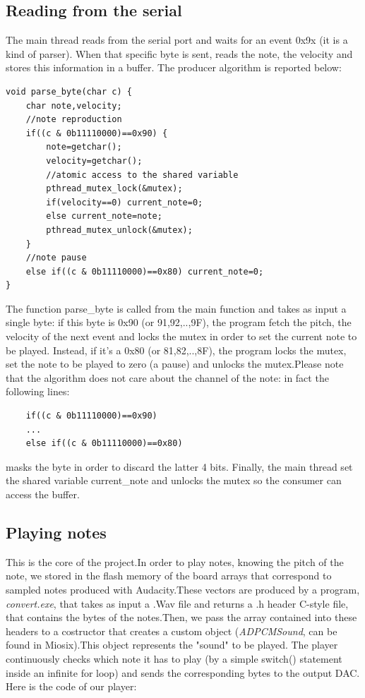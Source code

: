 \documentclass[12pt]{article}
\begin{document}
\subsection{Reading from the serial}\label{subsec:reading}
The main thread reads from the serial port and waits for an event 0x9x (it is a kind of parser). When that specific byte is sent, reads the note, the velocity and stores this information in a buffer. The producer algorithm is reported below:
\begin{lstlisting}
void parse_byte(char c) {
	char note,velocity;
	//note reproduction
	if((c & 0b11110000)==0x90) {
		note=getchar();
		velocity=getchar();
		//atomic access to the shared variable
		pthread_mutex_lock(&mutex);
		if(velocity==0) current_note=0;
		else current_note=note;
		pthread_mutex_unlock(&mutex);
	}
	//note pause
	else if((c & 0b11110000)==0x80) current_note=0;
}
\end{lstlisting}
The function parse\_byte is called from the main function and takes as input a single byte: if this byte is 0x90 (or 91,92,..,9F), the program fetch the pitch, the velocity of the next event and locks the mutex in order to set the current note to be played. Instead, if it's a 0x80 (or 81,82,..,8F), the program locks the mutex, set the note to be played to zero (a pause) and unlocks the mutex.Please note that the algorithm does not care about the channel of the note: in fact the following lines:
\begin{lstlisting}
	if((c & 0b11110000)==0x90)
	...
	else if((c & 0b11110000)==0x80)
\end{lstlisting}
masks the byte in order to discard the latter 4 bits.\newline
Finally, the main thread set the shared variable current\_note and unlocks the mutex so the consumer can access the buffer.

\subsection{Playing notes}
This is the core of the project.In order to play notes, knowing the pitch of the note, we stored in the flash memory of the board arrays that correspond to sampled notes produced with Audacity.These vectors are produced by a program, \textit{convert.exe}, that takes as input a .Wav file and returns a .h header C-style file, that contains the bytes of the notes.Then, we pass the array contained into these headers to a costructor that creates a custom object (\textit{ADPCMSound}, can be found in Miosix).This object represents the "sound" to be played.\newline
The player continuously checks which note it has to play (by a simple switch() statement inside an infinite for loop) and sends the corresponding bytes to the output DAC. Here is the code of our player:\newpage
\end{document}
